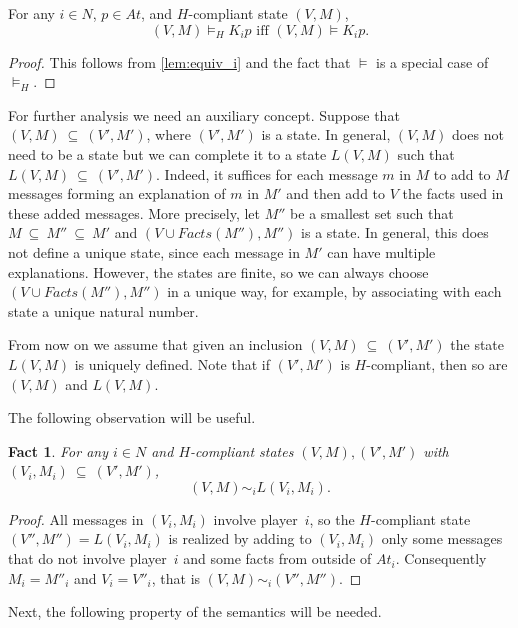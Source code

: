 \documentclass{article}
\newcounter{#1}
\newtheorem{fact}{Fact}[section]
\newtheorem{fact}{Fact}
\newcommand{\sse}{\mbox{$\:\subseteq\:$}}
\newcommand{\state}[1][]{\ensuremath{(V#1,M#1)}\xspace}
\newcommand{\bits}{\ensuremath{At}\xspace}
\newcommand{\knows}[1]{\ensuremath{K_{#1}}\xspace}
\begin{document}
\begin{corollary}
\label{result:ck-of-h-doesnt-matter-for-facts}
For any $i\in N$, $p\in\bits$, and $H$-compliant state $\state$,
\[
\mbox{$\state\vDash_H \knows i p$ iff $\state\vDash \knows i p$.}
\]
\end{corollary}
\begin{proof}
  This follows from \cref{lem:equiv_i} and the fact that $\vDash$ is a special case of $\vDash_H$.
\end{proof}

For further analysis we need an auxiliary concept. Suppose that $(V,M) \sse (V',
M')$, where $(V',M')$ is a state.  In general, $(V,M)$
does not need to be a state but we
can complete it to a state $L(V,M)$ such that $L(V,M)
\sse (V',M')$. Indeed, it suffices for each message $m$ in $M$ to add
to $M$ messages forming an explanation of $m$ in $M'$ and then add
to $V$ the facts used in these added messages.  More precisely, let
$M''$ be a smallest set such that $M \sse M'' \sse M'$ and $(V \cup
Facts(M''), M'')$ is a state. In general, this does not define
a unique state, since each message in $M'$ can have
multiple explanations. However, the states are finite, so we can
always choose $(V \cup Facts(M''), M'')$ in a unique way, for example,
by associating with each state a unique natural number.

From now on we assume that given an inclusion $(V,M) \sse (V', M')$
the state $L(V,M)$ is uniquely defined.  Note that if
\state['] is $H$-compliant, then so are \state and $L\state$.

The following observation will be useful.
\begin{fact}
  \label{fact:L}
For any $i\in N$ and $H$-compliant states $\state ,\state[']$ with $(V_i, M_i) \sse \state[']$,
\[
      \state \sim_i L(V_i, M_i).
\]
\end{fact}
\begin{proof}
All messages in $(V_i, M_i)$ involve player~$i$, so
the $H$-compliant state $\state[''] = L(V_i, M_i)$ is realized by adding to $(V_i,
M_i)$ only some messages that do not involve player~$i$ and some
facts from outside of $\bits_i$.  Consequently $M_i = M''_i$ and
$V_i = V''_i$, that is $\state \sim_i \state['']$.
\end{proof}

Next, the following property of the semantics will be needed.
\end{document}

